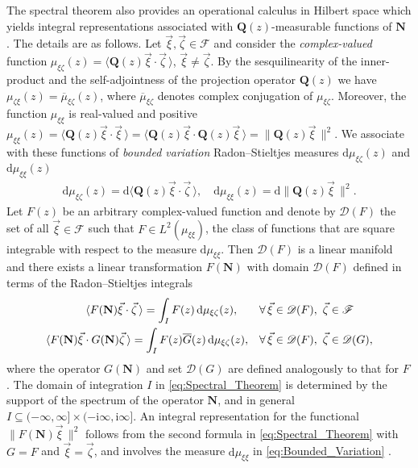 \documentclass[11pt]{amsart}
\newcommand{\I}{\mathrm{i}}
\renewcommand{\d}{\mathrm{d}}
\newcommand{\Qb}{\mathbf{Q}}
\newcommand{\Nb}{\mathbf{N}}
\newcommand{\Fs}{\mathscr{F}}
\begin{document}
The spectral theorem also provides an operational calculus in Hilbert
space which yields integral representations associated with
$\Qb(z)$-measurable functions of $\Nb$ \cite{Stone:64}. The details
are as follows. Let $\vec{\xi},\vec{\zeta}\in\Fs$ and consider the
\emph{complex-valued} function $\mu_{\xi\zeta}(z)=\langle\Qb(z)\vec{\xi}\cdot\vec{\zeta}\,\rangle$,
$\vec{\xi}\neq\vec{\zeta}$. By the sesquilinearity of the inner-product and the
self-adjointness of the projection operator $\Qb(z)$ we have
$\mu_{\zeta\xi}(z)=\overline{\mu}_{\xi\zeta}(z)$, where $\overline{\mu}_{\xi\zeta}$ denotes complex
conjugation of $\mu_{\xi\zeta}$. Moreover, the function $\mu_{\xi\xi}$ is
real-valued and positive
$\mu_{\xi\xi}(z)=\langle\Qb(z)\vec{\xi}\cdot\vec{\xi}\,\rangle=\langle\Qb(z)\vec{\xi}\cdot\Qb(z)\vec{\xi}\,\rangle
=\|\Qb(z)\vec{\xi}\,\|^2$. We associate with these functions of
\emph{bounded variation} Radon--Stieltjes measures $\d\mu_{\xi\zeta}(z)$ and
$\d\mu_{\xi\xi}(z)$ \cite{Stone:64}   
%
\begin{align}\label{eq:Bounded_Variation}
  \d\mu_{\xi\zeta}(z)=\d\langle\Qb(z)\vec{\xi}\cdot\vec{\zeta}\,\rangle, \quad
  \d\mu_{\xi\xi}(z)=\d\|\Qb(z)\vec{\xi}\,\|^2.
\end{align}
%
Let $F(z)$ be an arbitrary complex-valued function and denote by
$\mathscr{D}(F)$ the set of all $\vec{\xi}\in\Fs$ such that
$F\in L^2(\mu_{\xi\xi})$, the class of functions that are square integrable
with respect to the measure $\d\mu_{\xi\xi}$.
Then $\mathscr{D}(F)$ is a linear manifold and there exists a linear
transformation $F(\Nb)$ with domain $\mathscr{D}(F)$ defined in terms
of the Radon--Stieltjes integrals \cite{Stone:64} 
%
\begin{align}\label{eq:Spectral_Theorem}
  \langle F(\Nb)\vec{\xi}\cdot\vec{\zeta}\,\rangle=\int_IF(z)\,\d\mu_{\xi\zeta}(z), \qquad
  &\forall \, \vec{\xi}\in\mathscr{D}(F), \ \vec{\zeta}\in\Fs
  \\
  \langle F(\Nb)\vec{\xi}\cdot G(\Nb)\vec{\zeta}\,\rangle=\int_IF(z)\overline{G}(z)\,\d\mu_{\xi\zeta}(z),
  \quad
  &\forall \, \vec{\xi}\in\mathscr{D}(F), \ \vec{\zeta}\in\mathscr{D}(G),
  \notag
\end{align}
%
where the operator $G(\Nb)$ and set $\mathscr{D}(G)$ are defined
analogously to that for $F$. The domain of integration
$I$ in \eqref{eq:Spectral_Theorem} is determined by the support of the 
spectrum of the operator $\Nb$, and in general $I\subseteq(-\infty,\infty]\times(-\I\infty,\I\infty]$.
An integral representation for the functional $\|F(\Nb)\vec{\xi}\,\|^2$
follows from the second formula in \eqref{eq:Spectral_Theorem} with
$G=F$ and $\vec{\xi}=\vec{\zeta}$, and involves the measure $\d\mu_{\xi\xi}$ in
\eqref{eq:Bounded_Variation} \cite{Stone:64}.  
\end{document}
